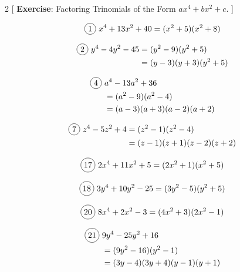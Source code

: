 \begin{multicols}{2}
[
  \textbf{Exercise}: Factoring Trinomials of the Form $ax^{4}+bx^{2}+c$.
]

\begin{align*}
  \circled{1}\ x^{4}+13x^{2}+40=(x^{2}+5)(x^{2}+8)
\end{align*}

\begin{align*}
  \circled{2}\ y^{4}-4y^{2}-45&=(y^{2}-9)(y^{2}+5)\\
  &=(y-3)(y+3)(y^{2}+5)
\end{align*}

\begin{align*}
  \circled{4}\ &a^{4}-13a^{2}+36\\
  &=(a^{2}-9)(a^{2}-4)\\
  &=(a-3)(a+3)(a-2)(a+2)
\end{align*}

\begin{align*}
  \circled{7}\ z^{4}-5z^{2}+4&=(z^{2}-1)(z^{2}-4)\\
  &=(z-1)(z+1)(z-2)(z+2)
\end{align*}

\begin{align*}
  \circled{17}\ 2x^{4}+11x^{2}+5=(2x^{2}+1)(x^{2}+5)\\
\end{align*}

  \[\circled{18}\ 3y^{4}+10y^{2}-25=(3y^{2}-5)(y^{2}+5)\]

  \[\circled{20}\ 8x^{4}+2x^{2}-3=(4x^{2}+3)(2x^{2}-1)\]

\begin{align*}
  \circled{21}\ &9y^{4}-25y^{2}+16\\
  &=(9y^{2}-16)(y^{2}-1)\\
  &=(3y-4)(3y+4)(y-1)(y+1)
\end{align*}
\end{multicols}

\vspace{.6cm}

